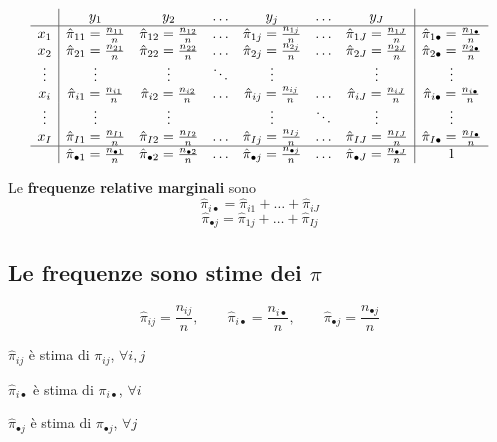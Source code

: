 \documentclass[
  11pt,
]{book}
\theoremstyle{mytheoremstyle}
\theoremstyle{mydefstyle}
\begin{document}
\[
\begin{array}{c|cccccc|c}
 &y_1 &y_2 &\ldots &y_j &\ldots &y_J &\\
  \hline
  x_1 & \hat\pi_{11}=\frac{n_{11}}{n} & \hat\pi_{12}=\frac{n_{12}}{n} & \ldots &\hat\pi_{1j}=\frac{n_{1j}}{n} &\ldots &\hat\pi_{1J}=\frac{n_{1J}}{n} & \hat\pi_{1\bullet}=\frac{n_{1\bullet}}{n}\\
  x_2 & \hat\pi_{21}=\frac{n_{21}}{n} & \hat\pi_{22}=\frac{n_{22}}{n} & \ldots &\hat\pi_{2j}=\frac{n_{2j}}{n} &\ldots &\hat\pi_{2J}=\frac{n_{2J}}{n} & \hat\pi_{2\bullet}=\frac{n_{2\bullet}}{n}\\
\vdots& \vdots & \vdots &\ddots &\vdots & &\vdots &\vdots \\
  x_i & \hat\pi_{i1}=\frac{n_{i1}}{n} & \hat\pi_{i2}=\frac{n_{i2}}{n} & \ldots &\hat\pi_{ij}=\frac{n_{ij}}{n} &\ldots & \hat\pi_{iJ}=\frac{n_{iJ}}{n}& \hat\pi_{i\bullet}=\frac{n_{i\bullet}}{n}\\
\vdots& \vdots & \vdots & &\vdots &\ddots &\vdots &\vdots \\
  x_I & \hat\pi_{I1}=\frac{n_{I1}}{n} & \hat\pi_{I2}=\frac{n_{I2}}{n} & \ldots &\hat\pi_{Ij}=\frac{n_{Ij}}{n} &\ldots &\hat\pi_{IJ}=\frac{n_{IJ}}{n} &\hat\pi_{I\bullet}=\frac{n_{I\bullet}}{n}\\
\hline
   & \hat\pi_{\bullet 1}=\frac{n_{\bullet 1}}{n}& \hat\pi_{\bullet 2}=\frac{n_{\bullet 2}}{n}& \ldots& \hat\pi_{\bullet j}=\frac{n_{\bullet j}}{n}& \ldots& \hat\pi_{\bullet J}=\frac{n_{\bullet J}}{n}& 1\\ 
\end{array}
\]

Le \textbf{frequenze relative marginali} sono
\[\hat\pi_{i\bullet}=\hat\pi_{i1}+\ldots+\hat\pi_{iJ}\]
\[\hat\pi_{\bullet j}=\hat\pi_{1j}+\ldots+\hat\pi_{Ij}\]

\subsection{\texorpdfstring{Le frequenze sono stime dei \(\pi\)}{Le frequenze sono stime dei \textbackslash pi}}\label{le-frequenze-sono-stime-dei-pi}

\[\hat\pi_{ij}=\frac{n_{ij}}n, \qquad \hat\pi_{i\bullet}=\frac{n_{i\bullet}}n,\qquad \hat\pi_{\bullet j}=\frac{n_{\bullet j}}n\]

\(\hat\pi_{ij}\) è stima di \(\pi_{ij}\), \(\forall i,j\)

\(\hat\pi_{i\bullet}\) è stima di \(\pi_{i\bullet}\), \(\forall i\)

\(\hat\pi_{\bullet j}\) è stima di \(\pi_{\bullet j}\), \(\forall j\)
\end{document}
